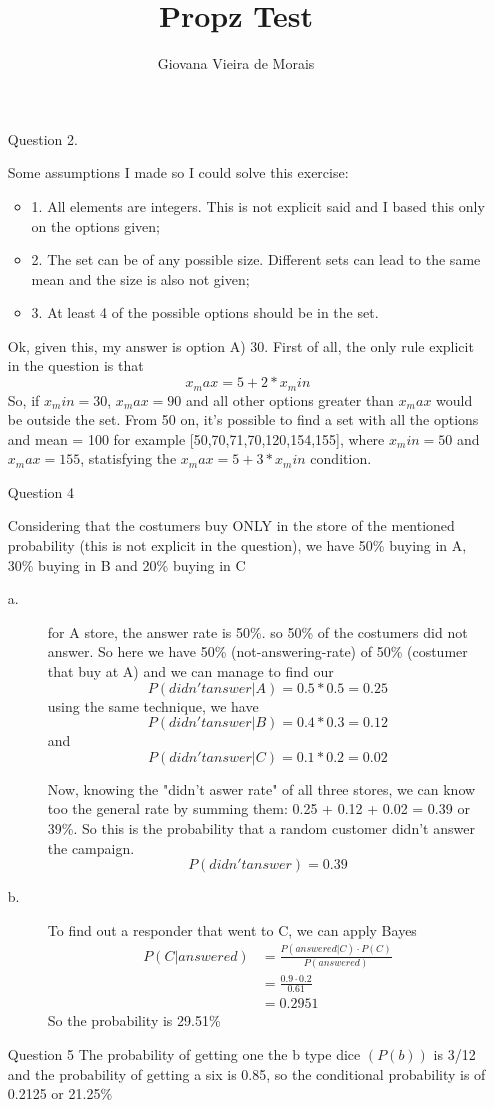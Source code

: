 \documentclass{article}
\title{Propz Test}
\author{Giovana Vieira de Morais}
\begin{document}
\maketitle

\begin{enumerate}
  \item[Question 2.]{
    Some assumptions I made so I could solve this exercise:
    \begin{itemize}
      \item{1. All elements are integers. This is not explicit said and I
        based this only on the options given;}
      \item{2. The set can be of any possible size. Different sets can lead to
        the same mean and the size is also not given;}
      \item{3. At least 4 of the possible options should be in the set.}
    \end{itemize}
    Ok, given this, my answer is option A) 30.
    First of all, the only rule explicit in the question is that
    $$ x_max = 5 + 2*x_min $$
    So, if $x_min = 30$, $x_max = 90$ and all other options greater than
    $x_max$ would be outside the set.
    From 50 on, it's possible to find a set with all the options and mean = 100
    for example [50,70,71,70,120,154,155], where $x_min = 50$ and $x_max = 155$,
    statisfying the $x_max = 5 + 3*x_min$ condition.
  }

  \item[Question 4]{
    Considering that the costumers buy ONLY in the store of the mentioned
    probability (this is not explicit in the question), we have
    50\% buying in A, 30\% buying in B and 20\% buying in C

    \begin{description}
      \item[a.]{
        for A store, the answer rate is 50\%. so 50\% of the costumers
        did not answer. So here we have 50\% (not-answering-rate) of 50\%
        (costumer that buy at A) and we can manage to find our
        $$ P(didn't answer|A) = 0.5*0.5 = 0.25 $$
        using the same technique, we have
        $$P(didn't answer|B) = 0.4*0.3 = 0.12$$
        and $$P(didn't answer|C) = 0.1*0.2 = 0.02$$

        Now, knowing the "didn't aswer rate" of all three stores, we can
        know too the general rate by summing them: 0.25 + 0.12 + 0.02 = 0.39
        or 39\%. So this is the probability that a random customer didn't
        answer the campaign.
        $$P(didn't answer) = 0.39$$
      }
      \item[b.]{
        To find out a responder that went to C, we can apply Bayes
        \begin{align*}
          P(C|answered) &= \frac{P(answered|C) \cdot P(C)}{P(answered)} \\
                        &= \frac{0.9 \cdot 0.2}{0.61} \\
                        &= 0.2951
        \end{align*}
        So the probability is 29.51\%
    }
    \end{description}
  }

  \item[Question 5]{
    The probability of getting one the b type dice $(P(b))$ is 3/12 and the
    probability of getting a six is 0.85, so the conditional probability is of
    0.2125 or 21.25\%
  }
\end{enumerate}
\end{document}
